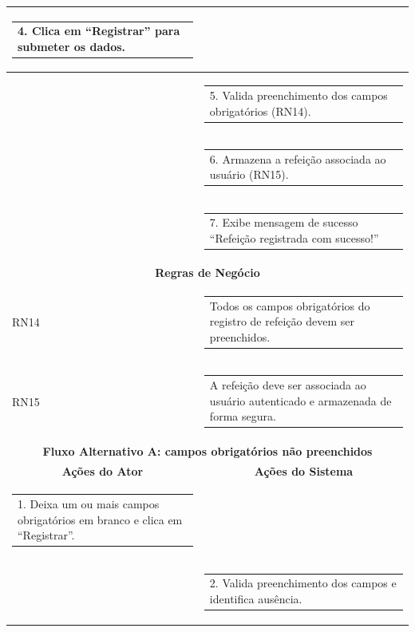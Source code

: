 \begin{longtable}[c]{|p{}|p{}|}
\multicolumn{1}{|p{0.48\textwidth}|}{\begin{tabular}[c]{@{}p{}@{}}4. Clica em ``Registrar'' para submeter os dados.\end{tabular}} & \\ \hline
\multicolumn{1}{|p{0.48\textwidth}|}{} &
  \begin{tabular}[c]{@{}p{}@{}}5. Valida preenchimento dos campos obrigatórios (RN14).\end{tabular} \\ \hline
\multicolumn{1}{|p{0.48\textwidth}|}{} &
  \begin{tabular}[c]{@{}p{}@{}}6. Armazena a refeição associada ao usuário (RN15).\end{tabular} \\ \hline
\multicolumn{1}{|p{0.48\textwidth}|}{} &
  \begin{tabular}[c]{@{}p{}@{}}7. Exibe mensagem de sucesso ``Refeição registrada com sucesso!''\end{tabular} \\ \hline
\multicolumn{2}{|c|}{\textbf{Regras de Negócio}} \\ \hline
\multicolumn{1}{|p{0.48\textwidth}|}{RN14} &
  \begin{tabular}[c]{@{}p{}@{}}Todos os campos obrigatórios do registro de refeição devem ser preenchidos.\end{tabular} \\ \hline
\multicolumn{1}{|p{0.48\textwidth}|}{RN15} &
  \begin{tabular}[c]{@{}p{}@{}}A refeição deve ser associada ao usuário autenticado e armazenada de forma segura.\end{tabular} \\ \hline
\multicolumn{2}{|c|}{\textbf{Fluxo Alternativo A: campos obrigatórios não preenchidos}} \\ \hline
\multicolumn{1}{|c|}{\textbf{Ações do Ator}} &
  \multicolumn{1}{c|}{\textbf{Ações do Sistema}} \\ \hline
\multicolumn{1}{|p{0.48\textwidth}|}{\begin{tabular}[c]{@{}p{}@{}}1. Deixa um ou mais campos obrigatórios em branco e clica em ``Registrar''.\end{tabular}} & \\ \hline
\multicolumn{1}{|p{0.48\textwidth}|}{} &
  \begin{tabular}[c]{@{}p{}@{}}2. Valida preenchimento dos campos e identifica ausência.\end{tabular} \\ \hline

\end{longtable}
